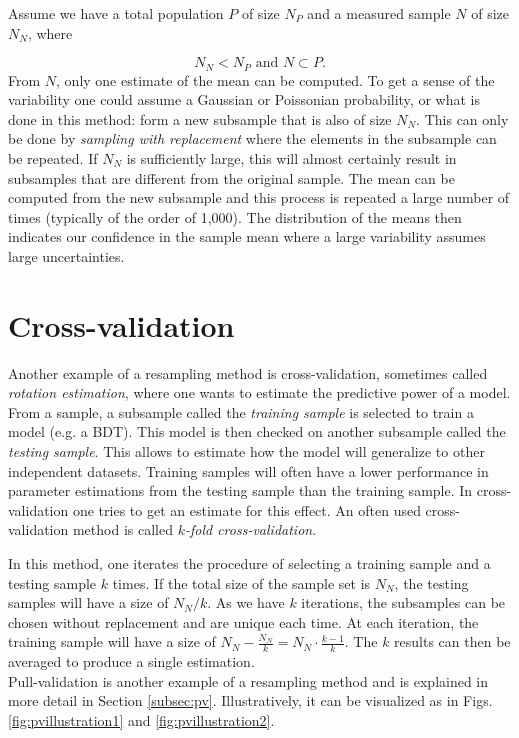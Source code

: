 \begin{appendices}
Assume we have a total population $P$ of size $N_P$ and a measured sample $N$ of size $N_N$, where 

\begin{equation}
N_N < N_P \textrm{ and } N \subset P.
\end{equation}
From $N$, only one estimate of the mean can be computed. To get a sense of the variability one could assume a Gaussian or Poissonian probability, or what is done in this method: form a new subsample that is also of size $N_N$. This can only be done by \textit{sampling with replacement} where the elements in the subsample can be repeated. If $N_N$ is sufficiently large, this will almost certainly result in subsamples that are different from the original sample. The mean can be computed from the new subsample and this process is repeated a large number of times (typically of the order of 1,000). The distribution of the means then indicates our confidence in the sample mean where a large variability assumes large uncertainties.

\section{Cross-validation}
Another example of a resampling method is cross-validation, sometimes called \textit{rotation estimation}, where one wants to estimate the predictive power of a model. From a sample, a subsample called the \textit{training sample} is selected to train a model (e.g. a BDT). This model is then checked on another subsample called the \textit{testing sample}. This allows to estimate how the model will generalize to other independent datasets. Training samples will often have a lower performance in parameter estimations from the testing sample than the training sample. In cross-validation one tries to get an estimate for this effect. An often used cross-validation method is called \textit{$k$-fold cross-validation}.

In this method, one iterates the procedure of selecting a training sample and a testing sample $k$ times. If the total size of the sample set is $N_N$, the testing samples will have a size of $N_N/k$. As we have $k$ iterations, the subsamples can be chosen without replacement and are unique each time. At each iteration, the training sample will have a size of $N_N - \frac{N_N}{k} = N_N \cdot \frac{k-1}{k}$. The $k$ results can then be averaged to produce a single estimation.\\

\noindent Pull-validation is another example of a resampling method and is explained in more detail in Section \ref{subsec:pv}. Illustratively, it can be visualized as in Figs. \ref{fig:pvillustration1} and \ref{fig:pvillustration2}.


\end{appendices}
